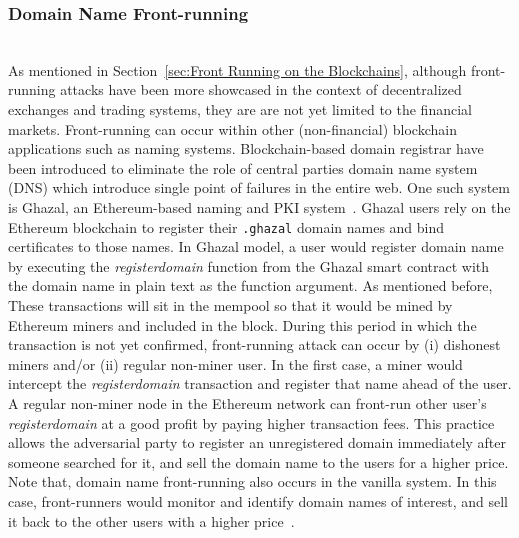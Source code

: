 \subsubsection{Domain Name Front-running} \hfill\\    %
\noindent As mentioned in Section~\ref{sec:Front Running on the Blockchains}, although front-running attacks have been more showcased in the context of decentralized exchanges and trading systems, they are are not yet limited to the financial markets. Front-running can occur within other (non-financial) blockchain applications such as naming systems. Blockchain-based domain registrar have been introduced to eliminate the role of central parties \ie domain name system (DNS) which introduce single point of failures in the entire web. One such system is Ghazal, an Ethereum-based naming and PKI system~\cite{moosavighazal}. Ghazal users rely on the Ethereum blockchain to register their \texttt{.ghazal} domain names and bind certificates to those names. In Ghazal model, a user would register domain name by executing the \textit{registerdomain} function from the Ghazal smart contract with the domain name in plain text as the function argument. As mentioned before, These transactions will sit in the mempool so that it would be mined by Ethereum miners and included in the block. During this period in which the transaction is not yet confirmed, front-running attack can occur by (i) dishonest miners and/or (ii) regular non-miner user. In the first case, a miner would intercept the \textit{registerdomain} transaction and register that name ahead of the user. A regular non-miner node in the Ethereum network can front-run other user's \textit{registerdomain} at a good profit by paying higher transaction fees. This practice allows the adversarial party  to register an unregistered domain immediately after someone searched for it, and sell the domain name to the users for a higher price. Note that, domain name front-running also occurs in the vanilla system. In this case, front-runners would monitor and identify domain names of interest, and sell it back to the other users with a higher price~\cite{sac022en33:online}.



